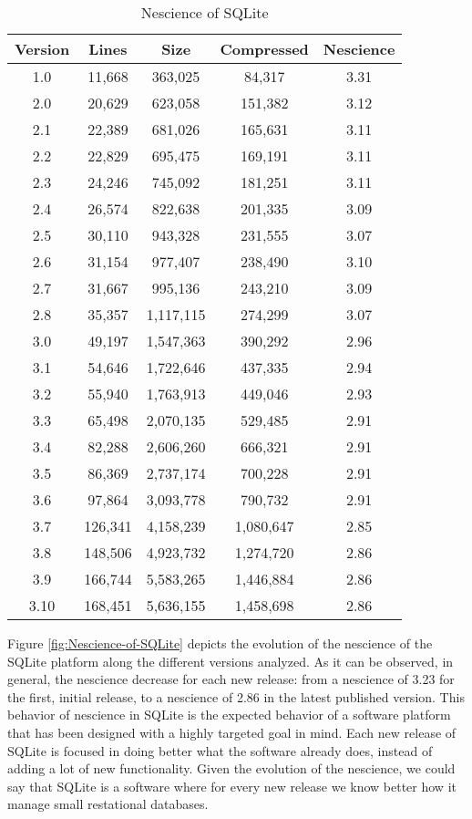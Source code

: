\begin{table}
\begin{centering}
\begin{tabular}{|c|c|c|c|c|}
\hline 
Version & Lines & Size & Compressed & Nescience\tabularnewline
\hline
\hline
1.0 & 11,668 & 363,025 & 84,317 & 3.31 \tabularnewline
\hline
2.0 & 20,629 & 623,058 & 151,382 & 3.12 \tabularnewline
\hline
2.1 & 22,389 & 681,026 & 165,631 & 3.11 \tabularnewline
\hline
2.2 & 22,829 & 695,475 & 169,191 & 3.11 \tabularnewline
\hline
2.3 & 24,246 & 745,092 & 181,251 & 3.11 \tabularnewline
\hline
2.4 & 26,574 & 822,638 & 201,335 & 3.09 \tabularnewline
\hline
2.5 & 30,110 & 943,328 & 231,555 & 3.07 \tabularnewline
\hline
2.6 & 31,154 & 977,407 & 238,490 & 3.10 \tabularnewline
\hline
2.7 & 31,667 & 995,136 & 243,210 & 3.09 \tabularnewline
\hline
2.8 & 35,357 & 1,117,115 & 274,299 & 3.07 \tabularnewline
\hline
3.0 & 49,197 & 1,547,363 & 390,292 & 2.96 \tabularnewline
\hline
3.1 & 54,646 & 1,722,646 & 437,335 & 2.94 \tabularnewline
\hline
3.2 & 55,940 & 1,763,913 & 449,046 & 2.93 \tabularnewline
\hline
3.3 & 65,498 & 2,070,135 & 529,485 & 2.91 \tabularnewline
\hline
3.4 & 82,288 & 2,606,260 & 666,321 & 2.91 \tabularnewline
\hline
3.5 & 86,369 & 2,737,174 & 700,228 & 2.91 \tabularnewline
\hline
3.6 & 97,864 & 3,093,778 & 790,732 & 2.91 \tabularnewline
\hline
3.7 & 126,341 & 4,158,239 & 1,080,647 & 2.85 \tabularnewline
\hline
3.8 & 148,506 & 4,923,732 & 1,274,720 & 2.86 \tabularnewline
\hline
3.9 & 166,744 & 5,583,265 & 1,446,884 & 2.86 \tabularnewline
\hline
3.10 & 168,451 & 5,636,155 & 1,458,698 & 2.86 \tabularnewline
\hline
\end{tabular}
\par\end{centering}
\caption{Nescience of SQLite}
\label{tab:Nescience-SQLite}
\end{table}

Figure \ref{fig:Nescience-of-SQLite} depicts the evolution of the nescience of the SQLite platform along the different versions analyzed. As it can be observed, in general, the nescience decrease for each new release: from a nescience of 3.23 for the first, initial release, to a nescience of 2.86 in the latest published version. This behavior of nescience in SQLite is the expected behavior of a software platform that has been designed with a highly targeted goal in mind. Each new release of SQLite is focused in doing better what the software already does, instead of adding a lot of new functionality. Given the evolution of the nescience, we could say that SQLite is a software where for every new release we know better how it manage small restational databases.

